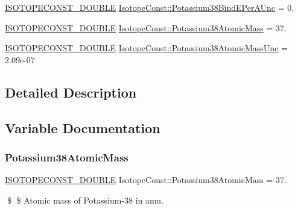 \begin{DoxyCompactItemize}
\mbox{\hyperlink{group___isotope_const-_macros_ga8f45a7272ce02c0b4c65c44636ed719a}{I\+S\+O\+T\+O\+P\+E\+C\+O\+N\+S\+T\+\_\+\+D\+O\+U\+B\+LE}} \mbox{\hyperlink{group___isotope_const-_potassium-_k38_ga23626c609545812f0fbb0ec4caf61fb1}{Isotope\+Const\+::\+Potassium38\+Bind\+E\+Per\+A\+Unc}} = 0.
\item 
\mbox{\hyperlink{group___isotope_const-_macros_ga8f45a7272ce02c0b4c65c44636ed719a}{I\+S\+O\+T\+O\+P\+E\+C\+O\+N\+S\+T\+\_\+\+D\+O\+U\+B\+LE}} \mbox{\hyperlink{group___isotope_const-_potassium-_k38_gae5b9809a1e119339a6fe64c3ead89dbd}{Isotope\+Const\+::\+Potassium38\+Atomic\+Mass}} = 37.
\item 
\mbox{\hyperlink{group___isotope_const-_macros_ga8f45a7272ce02c0b4c65c44636ed719a}{I\+S\+O\+T\+O\+P\+E\+C\+O\+N\+S\+T\+\_\+\+D\+O\+U\+B\+LE}} \mbox{\hyperlink{group___isotope_const-_potassium-_k38_ga7b896e71bbee67a7d7f15ec1e83b3c22}{Isotope\+Const\+::\+Potassium38\+Atomic\+Mass\+Unc}} = 2.\+09e-\/07
\end{DoxyCompactItemize}


\subsection{Detailed Description}


\subsection{Variable Documentation}
\mbox{\label{group___isotope_const-_potassium-_k38_gae5b9809a1e119339a6fe64c3ead89dbd}} 
\subsubsection{\texorpdfstring{Potassium38\+Atomic\+Mass}{Potassium38AtomicMass}}
{\footnotesize\ttfamily \mbox{\hyperlink{group___isotope_const-_macros_ga8f45a7272ce02c0b4c65c44636ed719a}{I\+S\+O\+T\+O\+P\+E\+C\+O\+N\+S\+T\+\_\+\+D\+O\+U\+B\+LE}} Isotope\+Const\+::\+Potassium38\+Atomic\+Mass = 37.}

\$ \$ Atomic mass of Potassium-\/38 in amu. \mbox{\label{group___isotope_const-_potassium-_k38_ga7b896e71bbee67a7d7f15ec1e83b3c22}} 
